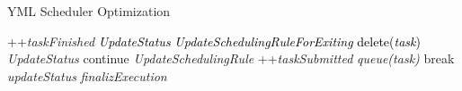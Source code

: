 \begin{algorithm}[htbp]{}
	\caption{YML Scheduler Optimization}   
	\label{alg:yml-scheduler-op}   
	\begin{algorithmic}[1]
		\State ++\textit{taskFinished}
		\EndWhile
		\State \textcolor{black}{\textit{UpdateStatus}} 
		\State \textcolor{black}{\textit{UpdateSchedulingRuleForExiting}}
		\State \textcolor{black}{delete(\textit{task})}
		\EndIf
		\State \textit{UpdateStatus}
		\State continue 
		\EndIf 
		\State \textit{UpdateSchedulingRule}
		\State ++\textit{taskSubmitted}
		\State \textit{queue(task)}
		\EndWhile
		\State break 
		\EndIf
		\State \textit{updateStatus}
		\EndWhile
		\State \textit{finalizExecution}
	\end{algorithmic}  
\end{algorithm}

